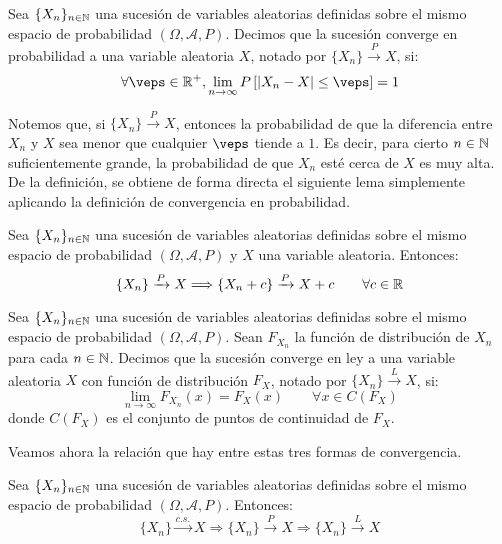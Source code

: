 \begin{definicion}
    Sea $\{X_n\}_{n\in \mathbb{N}}$ una sucesión de variables aleatorias definidas sobre el mismo espacio de probabilidad $(\Omega, \mathcal{A}, P)$. Decimos que la sucesión converge en probabilidad a una variable aleatoria $X$, notado por $\{X_n\} \xrightarrow{P} X$, si:
    \begin{equation*}
        \forall \veps \in \bb{R}^+, \lim_{n\to \infty} P\left[|X_n - X| \leq \veps\right] = 1
    \end{equation*}
\end{definicion}
Notemos que, si $\{X_n\} \xrightarrow{P} X$, entonces la probabilidad de que la diferencia entre $X_n$ y $X$ sea menor que cualquier $\veps$ tiende a $1$. Es decir, para cierto $n\in \mathbb{N}$ suficientemente grande, la probabilidad de que $X_n$ esté cerca de $X$ es muy alta. De la definición, se obtiene de forma directa el siguiente lema simplemente aplicando la definición de convergencia en probabilidad.
\begin{lema}\label{lema:suma_convergencia_probabilidad}
    Sea $\{X_n\}_{n\in \mathbb{N}}$ una sucesión de variables aleatorias definidas sobre el mismo espacio de probabilidad $(\Omega, \mathcal{A}, P)$ y $X$ una variable aleatoria. Entonces:
    \begin{equation*}
        \{X_n\} \xrightarrow{P} X \Longrightarrow \{X_n+ c\} \xrightarrow{P} X + c \qquad \forall c\in \mathbb{R}
    \end{equation*}
\end{lema}

\begin{definicion}
    Sea $\{X_n\}_{n\in \mathbb{N}}$ una sucesión de variables aleatorias definidas sobre el mismo espacio de probabilidad $(\Omega, \mathcal{A}, P)$. Sean $F_{X_n}$ la función de distribución de $X_n$ para cada $n\in \mathbb{N}$. Decimos que la sucesión converge en ley a una variable aleatoria $X$ con función de distribución $F_X$, notado por $\{X_n\} \xrightarrow{L} X$, si:
    \begin{equation*}
        \lim_{n\to \infty} F_{X_n}(x) = F_X(x) \qquad \forall x\in C(F_X)
    \end{equation*}    
    donde $C(F_X)$ es el conjunto de puntos de continuidad de $F_X$.
\end{definicion}

Veamos ahora la relación que hay entre estas tres formas de convergencia.
\begin{prop}
    Sea $\{X_n\}_{n\in \mathbb{N}}$ una sucesión de variables aleatorias definidas sobre el mismo espacio de probabilidad $(\Omega, \mathcal{A}, P)$. Entonces:
    \begin{equation*}
        \{X_n\} \xrightarrow{c.s.} X \Longrightarrow \{X_n\} \xrightarrow{P} X \Longrightarrow \{X_n\} \xrightarrow{L} X
    \end{equation*}
\end{prop}

